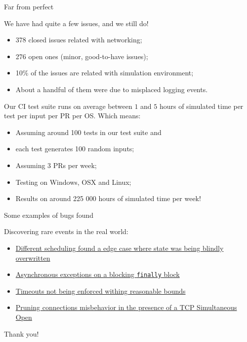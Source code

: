 \documentclass{beamer}
\begin{document}
\begin{frame}{Far from perfect}

  We have had quite a few issues, and we still do!

  \begin{itemize}
    \item \alert{378 closed issues} related with networking;
    \item \alert{276 open ones} (minor, good-to-have issues);
    \item \alert{10\%} of the issues are related with simulation environment;
    \item About a handful of them were due to misplaced logging events.
  \end{itemize}

  Our CI test suite runs on average between $1$ and $5$ hours of simulated time per test per input per PR per OS. Which means:

  \begin{itemize}
    \item Assuming around 100 tests in our test suite and
    \item each test generates 100 random inputs;
    \item Assuming 3 PRs per week;
    \item Testing on Windows, OSX and Linux;
    \item Results on around 225 000 hours of simulated time per week!
  \end{itemize}

\end{frame}

\begin{frame}{Some examples of bugs found}

  Discovering rare events in the real world:

  \begin{itemize}
    \item
      \href{https://github.com/input-output-hk/ouroboros-network/pull/3640/commits/f21334b7630c939a1ef35e452d10956cbf39e3fd}{Different
      scheduling found a edge case where state was being blindly overwritten}
    \vskip0.4cm
    \item
      \href{https://github.com/input-output-hk/ouroboros-network/issues/3572}{Asynchronous
      exceptions on a blocking \texttt{finally} block}
    \vskip0.4cm
    \item
      \href{https://github.com/input-output-hk/ouroboros-network/issues/3553}{Timeouts not
      being enforced withing reasonable bounds}
    \vskip0.4cm
    \item
      \href{https://github.com/input-output-hk/ouroboros-network/issues/3344}{Pruning
      connections misbehavior in the presence of a TCP Simultaneous Open}
  \end{itemize}

\end{frame}

\begin{frame}
  \centering
  Thank you!
\end{frame}
\end{document}
